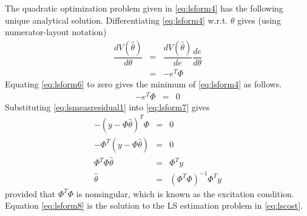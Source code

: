 The quadratic optimization problem given in \eqref{eq:lsform4} has the following unique analytical solution. Differentiating \eqref{eq:lsform4} w.r.t. $\theta$ gives (using numerator-layout notation)
\begin{eqnarray}
	\dfrac{dV(\hat{\theta})}{d\theta} &=& \dfrac{dV(\hat{\theta})}{de}\dfrac{de}{d\theta} \label{eq:lsform5} \\
	&=& -e^T\Phi \label{eq:lsform6}
\end{eqnarray}
Equating \eqref{eq:lsform6} to zero gives the minimum of \eqref{eq:lsform4} as follows.
\begin{eqnarray}
  -e^T\Phi &=& 0 \label{eq:lsform7}
\end{eqnarray}
Substituting \eqref{eq:lsmeasresidual1} into \eqref{eq:lsform7} gives
\begin{eqnarray}
- \left(y - \Phi\hat{\theta}\right)^T\Phi &=& 0 \nonumber \\
- \Phi^T\left(y - \Phi\hat{\theta}\right) &=& 0 \nonumber \\
 \Phi^T\Phi\hat{\theta} &=& \Phi^T y \nonumber \\
 \hat{\theta} &=& \left(\Phi^T\Phi\right)^{-1}\Phi^Ty \label{eq:lsform8}
\end{eqnarray}
provided that $\Phi^T\Phi$ is nonsingular, which is known as the excitation condition. Equation \eqref{eq:lsform8} is the solution to the LS estimation problem in \eqref{eq:lscost}.

